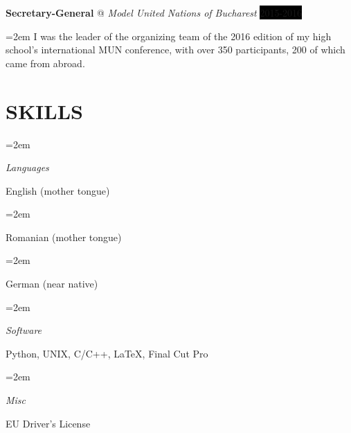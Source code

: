 \documentclass[paper=a4,fontsize=11pt]{scrartcl}
\makeatletter
\newlength{\spacebox}
\newcommand{\NewPart}[1]{\section*{\uppercase{#1}}}
\newcommand{\PersonalEntry}[2]{
		\noindent\hangindent=2em\hangafter=0 %
		\parbox{\spacebox}{        %
		\textit{#1}}		       %
		\hspace{1.5em} #2 \par}    %
\newcommand{\SkillsEntry}[2]{      %
		\noindent\hangindent=2em\hangafter=0 %
		\parbox{\spacebox}{        %
		\textit{#1}}			   %
		\hspace{1.5em} #2 \par}    %
\newcommand{\EducationEntry}[4]{
		\noindent \textbf{#1} \hfill      %
		\colorbox{Black}{%
			\parbox{6em}{%
			\hfill\color{White}#2}} \par  %
		\noindent \textit{#3} \par        %
		\noindent\hangindent=2em\hangafter=0 \small #4 %
		\normalsize \par}
\newcommand{\WorkEntry}[4]{				  %
		\noindent \textbf{#1} @ \textit{#3} \hfill      %
		\colorbox{Black}{\color{White}#2} \par  %
		\noindent\hangindent=2em\hangafter=0 \small #4 %
		\normalsize \par}
\makeatother
\begin{document}
\WorkEntry{Secretary-General}{2015-2016}{Model United Nations of Bucharest}{ I was the leader of the organizing team of the 2016 edition of my high school’s international MUN conference, with over 350 participants, 200 of which came from abroad.}

\NewPart{Skills}{}

\SkillsEntry{Languages}{English (mother tongue)}
\SkillsEntry{}{Romanian (mother tongue)}
\SkillsEntry{}{German (near native)}

\SkillsEntry{Software}{Python, \textsc{UNIX}, \textsc{C/C++}, \LaTeX, Final Cut Pro}
\SkillsEntry{Misc}{EU Driver's License}


\end{document}
